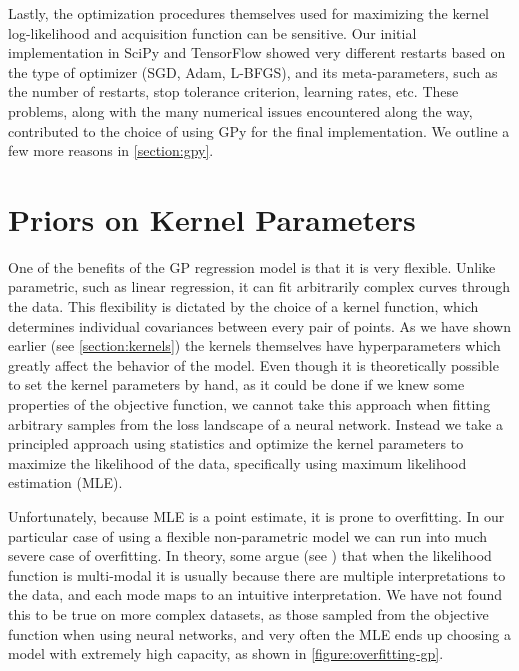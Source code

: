 Lastly, the optimization procedures themselves used for maximizing the kernel log-likelihood and acquisition function can be sensitive. Our initial implementation in SciPy and TensorFlow showed very different restarts based on the type of optimizer (SGD, Adam, L-BFGS), and its meta-parameters, such as the number of restarts, stop tolerance criterion, learning rates, etc. These problems, along with the many numerical issues encountered along the way, contributed to the choice of using GPy for the final implementation. We outline a few more reasons in \autoref{section:gpy}.


\section{Priors on Kernel Parameters}
\label{section:priors-on-kernel-params}

One of the benefits of the GP regression model is that it is very flexible. Unlike parametric, such as linear regression, it can fit arbitrarily complex curves through the data. This flexibility is dictated by the choice of a kernel function, which determines individual covariances between every pair of points. As we have shown earlier (see \autoref{section:kernels}) the kernels themselves have hyperparameters which greatly affect the behavior of the model. Even though it is theoretically possible to set the kernel parameters by hand, as it could be done if we knew some properties of the objective function, we cannot take this approach when fitting arbitrary samples from the loss landscape of a neural network. Instead we take a principled approach using statistics and optimize the kernel parameters to maximize the likelihood of the data, specifically using maximum likelihood estimation (MLE).

Unfortunately, because MLE is a point estimate, it is prone to overfitting. In our particular case of using a flexible non-parametric model we can run into much severe case of overfitting. In theory, some argue (see \citep{williams2006gaussian}) that when the likelihood function is multi-modal it is usually because there are multiple interpretations to the data, and each mode maps to an intuitive interpretation. We have not found this to be true on more complex datasets, as those sampled from the objective function when using neural networks, and very often the MLE ends up choosing a model with extremely high capacity, as shown in \autoref{figure:overfitting-gp}.

